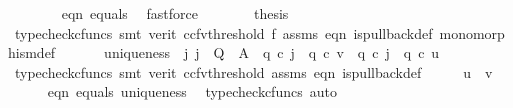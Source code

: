 \begin{isabellebody}
\ \ \ \ \ \ \isamarkupfalse%
\ eqn{}\ equals\ \isamarkupfalse%
\ fastforce\isanewline
\ \ \ \ \isamarkupfalse%
\ \isamarkupfalse%
\ {\isacharquery}{\kern0pt}thesis\isanewline
\ \ \ \ \ \ \isamarkupfalse%
\ {\isacharparenleft}{\kern0pt}typecheck{\isacharunderscore}{\kern0pt}cfuncs{\isacharcomma}{\kern0pt}\ smt\ {\isacharparenleft}{\kern0pt}verit{\isacharcomma}{\kern0pt}\ ccfv{\isacharunderscore}{\kern0pt}threshold{\isacharparenright}{\kern0pt}\ f{}\ assms{\isacharparenleft}{\kern0pt}{}{\isacharcomma}{\kern0pt}{}{\isacharparenright}{\kern0pt}\ eqn{}\ is{\isacharunderscore}{\kern0pt}pullback{\isacharunderscore}{\kern0pt}def\ monomorphism{\isacharunderscore}{\kern0pt}def{}{\isacharparenright}{\kern0pt}\isanewline
\ \ \isamarkupfalse%
\isanewline
\isanewline
\ \ \isamarkupfalse%
\ uniqueness{\isacharcolon}{\kern0pt}\ {\isachardoublequoteopen}{\isasymexists}{\isacharbang}{\kern0pt}\ j{\isachardot}{\kern0pt}\ {\isacharparenleft}{\kern0pt}j\ {\isacharcolon}{\kern0pt}\ Q\ {\isasymrightarrow}\ A\ {\isasymand}\ q{}\ {\isasymcirc}\isactrlsub c\ j\ {\isacharequal}{\kern0pt}\ q{}\ {\isasymcirc}\isactrlsub c\ v\ {\isasymand}\ q{}\ {\isasymcirc}\isactrlsub c\ j\ {\isacharequal}{\kern0pt}\ q{}\ {\isasymcirc}\isactrlsub c\ u{\isacharparenright}{\kern0pt}{\isachardoublequoteclose}\isanewline
\ \ \ \isamarkupfalse%
\ {\isacharparenleft}{\kern0pt}typecheck{\isacharunderscore}{\kern0pt}cfuncs{\isacharcomma}{\kern0pt}\ smt\ {\isacharparenleft}{\kern0pt}verit{\isacharcomma}{\kern0pt}\ ccfv{\isacharunderscore}{\kern0pt}threshold{\isacharparenright}{\kern0pt}\ assms{\isacharparenleft}{\kern0pt}{}{\isacharparenright}{\kern0pt}\ eqn{}\ is{\isacharunderscore}{\kern0pt}pullback{\isacharunderscore}{\kern0pt}def{\isacharparenright}{\kern0pt}\isanewline
\ \ \isamarkupfalse%
\ \isamarkupfalse%
\ {\isachardoublequoteopen}u\ {\isacharequal}{\kern0pt}\ v{\isachardoublequoteclose}\isanewline
\ \ \ \ \isamarkupfalse%
\ eqn{}\ equals\ uniqueness\ \isamarkupfalse%
\ {\isacharparenleft}{\kern0pt}typecheck{\isacharunderscore}{\kern0pt}cfuncs{\isacharcomma}{\kern0pt}\ auto{\isacharparenright}{\kern0pt}\isanewline
{}\isamarkupfalse%
%
\endisatagproof
{\isafoldproof}%
%
\isadelimproof
%
\endisadelimproof
%
\begin{isamarkuptext}%

\end{isamarkuptext}
\end{isabellebody}
